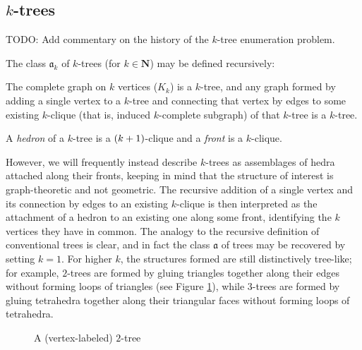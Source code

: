 \documentclass[sectionflow,singlespace,twoside,boldmathhdr]{brandiss} %
\numberwithin{section}{chapter}
\numberwithin{figure}{chapter}
\begin{document}
\subsection{$k$-trees}\label{ss:ktrees}
TODO: Add commentary on the history of the $k$-tree enumeration problem.

The class $\mathfrak{a}_{k}$ of $k$-trees (for $k \in \mathbf{N}$) may be defined recursively:
\begin{definition}
  \label{def:ktree}
  The complete graph on $k$ vertices ($K_{k}$) is a $k$-tree, and any graph formed by adding a single vertex to a $k$-tree and connecting that vertex by edges to some existing $k$-clique (that is, induced $k$-complete subgraph) of that $k$-tree is a $k$-tree.
\end{definition}
A \emph{hedron} of a $k$-tree is a $\left( {k+1} \right)$-clique and a \emph{front} is a $k$-clique.

However, we will frequently instead describe $k$-trees as assemblages of hedra attached along their fronts, keeping in mind that the structure of interest is graph-theoretic and not geometric.
The recursive addition of a single vertex and its connection by edges to an existing $k$-clique is then interpreted as the attachment of a hedron to an existing one along some front, identifying the $k$ vertices they have in common.
The analogy to the recursive definition of conventional trees is clear, and in fact the class $\mathfrak{a}$ of trees may be recovered by setting $k = 1$.
For higher $k$, the structures formed are still distinctively tree-like; for example, $2$-trees are formed by gluing triangles together along their edges without forming loops of triangles (see Figure \ref{fig:ex2tree}), while $3$-trees are formed by gluing tetrahedra together along their triangular faces without forming loops of tetrahedra.

\begin{figure}[htb]
  \centering
  \caption{A (vertex-labeled) $2$-tree}
  \label{fig:ex2tree}
\end{figure}
\end{document}
